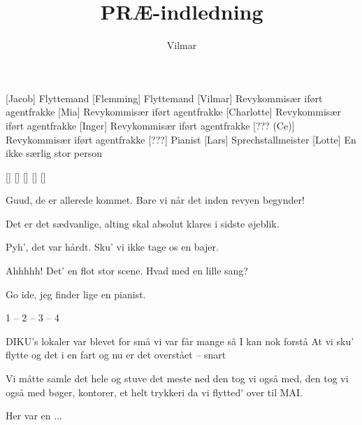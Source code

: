 \documentclass[a4paper,11pt]{article}
\title{PRÆ-indledning}
\author{Vilmar}
\begin{document}
\maketitle

\begin{roles}
[Jacob] Flyttemand
[Flemming] Flyttemand
[Vilmar] Revykommisær iført agentfrakke
[Mia] Revykommisær iført agentfrakke
[Charlotte] Revykommisær iført agentfrakke
[Inger] Revykommisær iført agentfrakke
[??? (Ce)] Revykommisær iført agentfrakke
[???] Pianist
[Lars] Sprechstallmeister
[Lotte] En ikke særlig stor person
\end{roles}

\begin{props}
[]
[]
[]
[]
[]
\end{props}


\begin{sketch}


 Guud, de er allerede kommet.  Bare vi når det inden revyen begynder!

 Det er det sædvanlige, alting skal absolut klares i sidste øjeblik.


 Pyh', det var hårdt. Sku' vi ikke tage os en bajer. 

 Ahhhhh! Det' en flot stor scene. Hvad med en lille sang?

 Go ide, jeg finder lige en pianist. 

 1 -- 2 -- 3 -- 4

\end{sketch}


\begin{song}

 DIKU's lokaler var blevet for små
 vi var får mange så I kan nok forstå
 At vi sku' flytte og det i en fart
 og nu er det overstået -- snart

Vi måtte samle det hele og stuve det meste ned
den tog vi også med, den tog vi også med
bøger, kontorer, et helt trykkeri
da vi flytted' over til MAI.

 Her var en ... 
\end{song}
\end{document}
